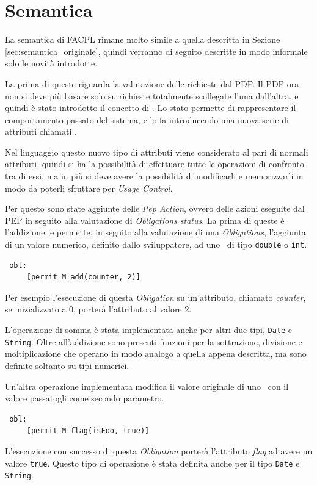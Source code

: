 \section{Semantica} %
\label{sec:semantica}
La semantica di FACPL rimane molto simile a quella descritta in Sezione \ref{sec:semantica_originale}, quindi verranno di seguito descritte in modo informale solo le novità introdotte. \par
La prima di queste riguarda la valutazione delle richieste dal \ac{PDP}. Il \ac{PDP} ora non si deve più basare solo su richieste totalmente scollegate l'una dall'altra, e quindi è stato introdotto il concetto di \status.
Lo stato permette di rappresentare il comportamento passato del sistema, e lo fa introducendo una nuova serie di attributi chiamati \statusattribute.\par
Nel linguaggio questo nuovo tipo di attributi viene considerato al pari di normali attributi, quindi si ha la possibilità di effettuare tutte le operazioni di confronto tra di essi, ma in più si deve avere la possibilità di modificarli e memorizzarli in modo da poterli sfruttare per \textit{Usage Control}. \par

Per questo sono state aggiunte delle \textit{Pep Action}, ovvero delle azioni eseguite dal \ac{PEP} in seguito alla valutazione di \textit{Obligations status}. La prima di queste è l'addizione, 
 e permette, in seguito alla valutazione di una \textit{Obligations}, l'aggiunta di un valore numerico, definito dallo sviluppatore, ad uno \statusattribute \ di tipo \texttt{double} o \texttt{int}. 
\begin{verbatim}
 obl:
     [permit M add(counter, 2)]
\end{verbatim}
Per esempio l'esecuzione di questa \textit{Obligation} su un'attributo, chiamato \textit{counter}, se inizializzato a $0$, porterà l'attributo al 
valore 2. 

L'operazione di somma è stata implementata anche per altri due tipi, \texttt{Date} e \texttt{String}.
Oltre all'addizione sono presenti funzioni per la sottrazione, divisione e moltiplicazione che operano in modo analogo a quella appena descritta, ma sono definite soltanto su tipi numerici.

Un'altra operazione implementata modifica il valore originale di uno \statusattribute \ con il valore passatogli come secondo parametro.
\begin{verbatim}
 obl:
     [permit M flag(isFoo, true)]
\end{verbatim}
L'esecuzione con successo di questa \textit{Obligation} porterà l'attributo \textit{flag} ad avere un valore \texttt{true}. Questo tipo di operazione è stata definita anche per il tipo \texttt{Date} e \texttt{String}.

